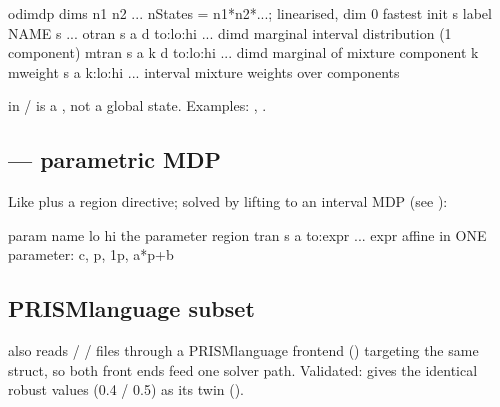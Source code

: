 \documentclass[a4paper,10pt,english]{sphinxmanual}
\begin{document}
\begin{sphinxVerbatim}[commandchars=\\\{\}]
odimdp
dims \PYGZlt{}n1\PYGZgt{} \PYGZlt{}n2\PYGZgt{} ...                     \PYGZsh{} nStates = n1*n2*...; linearised, dim 0 fastest
init \PYGZlt{}s\PYGZgt{}
label \PYGZlt{}NAME\PYGZgt{} \PYGZlt{}s\PYGZgt{} ...
otran  \PYGZlt{}s\PYGZgt{} \PYGZlt{}a\PYGZgt{} \PYGZlt{}d\PYGZgt{} to:lo:hi ...        \PYGZsh{} dim\PYGZhy{}d marginal interval distribution (1 component)
mtran  \PYGZlt{}s\PYGZgt{} \PYGZlt{}a\PYGZgt{} \PYGZlt{}k\PYGZgt{} \PYGZlt{}d\PYGZgt{} to:lo:hi ...    \PYGZsh{} dim\PYGZhy{}d marginal of mixture component k
mweight \PYGZlt{}s\PYGZgt{} \PYGZlt{}a\PYGZgt{} k:lo:hi ...            \PYGZsh{} interval mixture weights over components
\end{sphinxVerbatim}

\sphinxAtStartPar
{} in / is a  ,
not a global state. Examples: , .


\subsection{ — parametric MDP}
\label{\detokenize{manual/formats:pimdp-parametric-mdp}}
\sphinxAtStartPar
Like  plus a region directive; solved by lifting to an interval MDP (see
{\hyperref[\detokenize{manual/parametric::doc}]{}}):

\begin{sphinxVerbatim}[commandchars=\\\{\}]
param \PYGZlt{}name\PYGZgt{} \PYGZlt{}lo\PYGZgt{} \PYGZlt{}hi\PYGZgt{}             \PYGZsh{} the parameter region
tran \PYGZlt{}s\PYGZgt{} \PYGZlt{}a\PYGZgt{} \PYGZlt{}to\PYGZgt{}:\PYGZlt{}expr\PYGZgt{} ...       \PYGZsh{} \PYGZlt{}expr\PYGZgt{} affine in ONE parameter: c, p, 1\PYGZhy{}p, a*p+b
\end{sphinxVerbatim}


\subsection{PRISM\sphinxhyphen{}language subset}
\label{\detokenize{manual/formats:prism-language-subset}}
\sphinxAtStartPar
{} also reads  /  /  files through a PRISM\sphinxhyphen{}language
front\sphinxhyphen{}end () targeting the same  struct, so both front ends feed
one solver path. Validated:  gives the identical robust values (0.4 /
0.5) as its  twin ().
\end{document}
